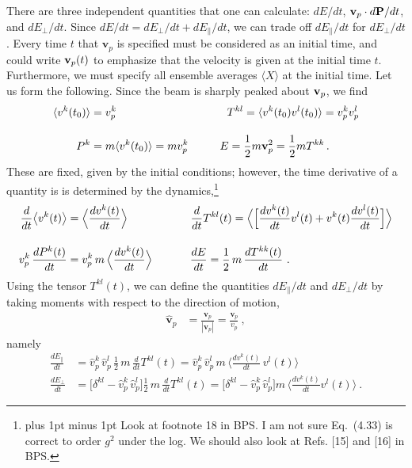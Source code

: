 \documentclass[preprint,12pt,eqsecnum,nofootinbib,amsmath,amssymb]{revtex4}
\newcommand{\footnoteskip}{\baselineskip 12pt plus 1pt minus 1pt}
\begin{document}
There are three independent quantities
that one can calculate: $dE/dt$, ${\bf v}_p \cdot d{\bf P}/dt$, and
$dE_\perp/dt$. Since $dE/dt  = dE_\perp/dt + dE_\parallel/dt$,
we can trade off $dE_\parallel/dt$ for $dE_\perp/dt$. Every time 
$t$ that $\mathbf v_p$ is specified must be considered as an initial 
time, and could write ${\bf v}_p(t)$ to emphasize that the velocity
is given at the initial time $t$. Furthermore, we must specify all 
ensemble averages $\langle X \rangle$ at the initial time. Let us 
form the following. Since the beam is sharply peaked about ${\bf v}_p$, 
we find
\begin{align}
  \langle v^k(t_0) \rangle 
  &= 
  v_p^k 
  \hskip3.5cm
  T^{kl} = \langle v^k(t_0) v^l(t_0)  \rangle = v_p^k v_p^l 
  \\[10pt]
   P^k &= m \langle v^k(t_0) \rangle  = m v_p^k 
   \hskip1.0cm
   E = \frac{1}{2} m \mathbf v_p^2 = \frac{1}{2} m T^{kk} \,.
\end{align}
These are fixed, given by the initial conditions; however, the time derivative
of a quantity is  is determined by the dynamics,\footnote{
\footnoteskip
Look at footnote 18 in BPS. I am not sure Eq.~(4.33) is correct to order $g^2$ 
under the log. We should also look at Refs. [15] and [16] in BPS.
} %
\begin{align}
  \frac{d}{dt}\big\langle v^k(t) \big\rangle &= 
    \Big\langle \frac{d v^k(t)}{dt} \Big\rangle 
\hskip2.0cm
\frac{d}{dt} T^{kl}(t) =
 \Big\langle \Big[\frac{d v^k(t)}{dt} v^l(t) +
    v^k(t)  \frac{d v^l(t)}{dt} \Big] \Big\rangle 
\\[11pt]
v_p^k\, \frac{dP^k(t)}{dt} 
&= v_p^k \, m \, \Big\langle \frac{d v^k(t)}{dt} \Big\rangle 
\hskip1.2cm
\frac{dE}{dt} = \frac{1}{2}\,m \, \frac{dT^{kk}(t)}{dt}
\ .
\end{align}
Using the tensor $T^{kl}(t)$, we can define the quantities 
$dE_\parallel/dt$ and $dE_\perp/dt$ by taking moments
with respect to the direction of  motion,
\begin{align}
  \hat{\mathbf v}_p 
  &= \frac{{\mathbf v}_p}{|{\mathbf v}_p|}
   = \frac{{\mathbf v}_p}{v_p}
\ ,
\end{align}
namely
\begin{align}
  \frac{d E_\parallel}{dt} 
  &= 
  \hat v^k_p \,\hat v^l_p \, \frac{1}{2}\, m \,\frac{d}{dt} T^{kl}(t) 
  =
  \hat v^k_p \, \hat v^l_p\, m \,
  \Big\langle \frac{d v^k(t)}{dt} \, v^l(t)\Big\rangle 
\\[11pt]
  \frac{d E_\perp}{dt} 
  &=
  \Big[ \delta^{kl}-\hat v^k_p \, \hat v^l_p \Big] 
  \frac{1}{2}\, m \, \frac{d}{dt} T^{kl}(t) 
  =
  \Big[ \delta^{kl}-\hat v^k_p \, \hat v^l_p \Big] m\, 
  \Big\langle \frac{d v^k(t)}{dt} v^l(t)\Big\rangle 
  \ .
\end{align}
\end{document}
